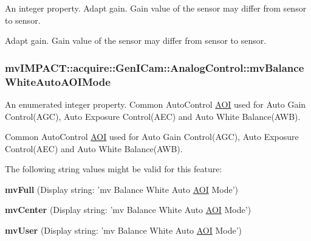 An integer property. Adapt gain. Gain value of the sensor may differ from sensor to sensor. 

Adapt gain. Gain value of the sensor may differ from sensor to sensor. \hypertarget{classmv_i_m_p_a_c_t_1_1acquire_1_1_gen_i_cam_1_1_analog_control_ac6e3d9808dbe4028dd44ed901c7664ae}{
\subsubsection[{mv\+Balance\+White\+Auto\+A\+O\+I\+Mode}]{ mv\+I\+M\+P\+A\+C\+T\+::acquire\+::\+Gen\+I\+Cam\+::\+Analog\+Control\+::mv\+Balance\+White\+Auto\+A\+O\+I\+Mode}}\label{classmv_i_m_p_a_c_t_1_1acquire_1_1_gen_i_cam_1_1_analog_control_ac6e3d9808dbe4028dd44ed901c7664ae}


An enumerated integer property. Common Auto\+Control \hyperlink{struct_a_o_i}{A\+O\+I} used for Auto Gain Control(\+A\+G\+C), Auto Exposure Control(\+A\+E\+C) and Auto White Balance(\+A\+W\+B). 

Common Auto\+Control \hyperlink{struct_a_o_i}{A\+O\+I} used for Auto Gain Control(\+A\+G\+C), Auto Exposure Control(\+A\+E\+C) and Auto White Balance(\+A\+W\+B).

The following string values might be valid for this feature\+:
\begin{DoxyItemize}
\item {\bfseries mv\+Full} (Display string\+: 'mv Balance White Auto \hyperlink{struct_a_o_i}{A\+O\+I} Mode')
\item {\bfseries mv\+Center} (Display string\+: 'mv Balance White Auto \hyperlink{struct_a_o_i}{A\+O\+I} Mode')
\item {\bfseries mv\+User} (Display string\+: 'mv Balance White Auto \hyperlink{struct_a_o_i}{A\+O\+I} Mode')
\end{DoxyItemize}

